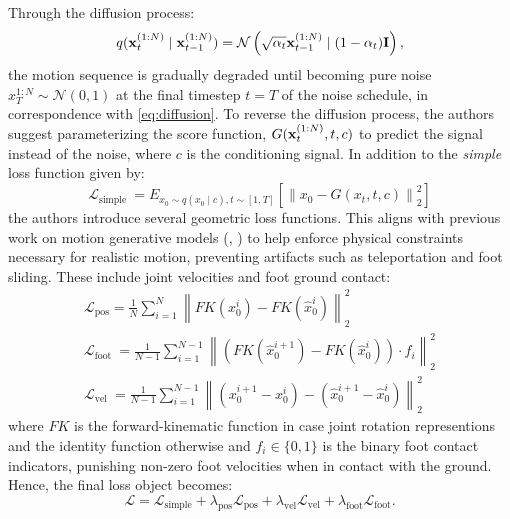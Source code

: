 Through the diffusion process:
\begin{equation}
    q(\boldsymbol{\mathbf{x}}_t^{(1:N)} \mid \boldsymbol{\mathbf{x}}_{t-1}^{(1:N)}) = \mathcal{N}\left( \sqrt{\alpha_t} \boldsymbol{\mathbf{x}}_{t-1}^{(1:N)} \mid (1 - \alpha_t) \boldsymbol{\mathbf{I}} \right),
\end{equation} 
the motion sequence is gradually degraded until becoming pure noise $x_T^{1:N} \sim \mathcal{N}(0, 1)$ at the final timestep $t=T$ of the noise schedule, in correspondence with \cref{eq:diffusion}. To reverse the diffusion process, the authors suggest parameterizing the score function, $G(\boldsymbol{\mathbf{x}}_t^{(1:N)}, t, c)$ to predict the signal instead of the noise, where $c$ is the conditioning signal. In addition to the \textit{simple} loss function given by:
\begin{equation}
    \mathcal{L}_{\text {simple }}=E_{x_0 \sim q\left(x_0 \mid c\right), t \sim[1, T]}\left[\left\|x_0-G\left(x_t, t, c\right)\right\|_2^2\right]
\end{equation}
the authors introduce several geometric loss functions. This aligns with previous work on motion generative models (\cite{petrovich2021actionconditioned3dhumanmotion}, \cite{Shi_2020}) to help enforce physical constraints necessary for realistic motion, preventing artifacts such as teleportation and foot sliding. These include joint velocities and foot ground contact:
\begin{equation}
    \begin{gathered}
        \mathcal{L}_{\mathrm{pos}}=\frac{1}{N} \sum_{i=1}^N\left\|F K\left(x_0^i\right)-F K\left(\hat{x}_0^i\right)\right\|_2^2 \\
        \mathcal{L}_{\text {foot }}=\frac{1}{N-1} \sum_{i=1}^{N-1}\left\|\left(F K\left(\hat{x}_0^{i+1}\right)-F K\left(\hat{x}_0^i\right)\right) \cdot f_i\right\|_2^2 \\
        \mathcal{L}_{\text {vel }}=\frac{1}{N-1} \sum_{i=1}^{N-1}\left\|\left(x_0^{i+1}-x_0^i\right)-\left(\hat{x}_0^{i+1}-\hat{x}_0^i\right)\right\|_2^2
    \end{gathered}
\end{equation}
where $FK$ is the forward-kinematic function in case joint rotation representions and the identity function otherwise and $f_i \in \{ 0, 1 \}$ is the binary foot contact indicators, punishing non-zero foot velocities when in contact with the ground. Hence, the final loss object becomes:
\begin{equation}
    \mathcal{L} = \mathcal{L}_\text{simple} + \lambda_\text{pos} \mathcal{L}_\text{pos} + \lambda_\text{vel} \mathcal{L}_\text{vel} + \lambda_\text{foot} \mathcal{L}_\text{foot}.
\end{equation}

